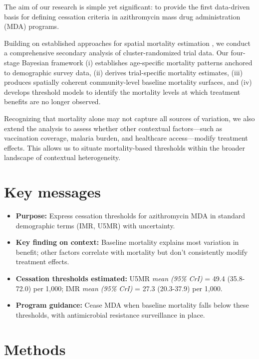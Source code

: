 \documentclass[11pt]{article}\usepackage[]{graphicx}\usepackage[]{xcolor}
\begin{document}
The aim of our research is simple yet significant: to provide the first data-driven basis for defining cessation criteria in azithromycin mass drug administration (MDA) programs.

Building on established approaches for spatial mortality estimation \citep{besag1991bym, mercer2015aoas, wakefield2020insr}, we conduct a comprehensive secondary analysis of cluster-randomized trial data. Our four-stage Bayesian framework (i) establishes age-specific mortality patterns anchored to demographic survey data, (ii) derives trial-specific mortality estimates, (iii) produces spatially coherent community-level baseline mortality surfaces, and (iv) develops threshold models to identify the mortality levels at which treatment benefits are no longer observed.

Recognizing that mortality alone may not capture all sources of variation, we also extend the analysis to assess whether other contextual factors—such as vaccination coverage, malaria burden, and healthcare access—modify treatment effects. This allows us to situate mortality-based thresholds within the broader landscape of contextual heterogeneity.


\section*{Key messages}



\begin{itemize}[leftmargin=1.1em]
\item \textbf{Purpose:} Express cessation thresholds for azithromycin MDA in standard demographic terms (IMR, U5MR) with uncertainty.
\item \textbf{Key finding on context:} Baseline mortality explains most variation in benefit; other factors correlate with mortality but don't consistently modify treatment effects.
\item \textbf{Cessation thresholds estimated:} U5MR \emph{mean (95\% CrI)} = 49.4 (35.8-72.0) per 1,000; IMR \emph{mean (95\% CrI)} = 27.3 (20.3-37.9) per 1,000.
\item \textbf{Program guidance:} Cease MDA when baseline mortality falls below these thresholds, with antimicrobial resistance surveillance in place.
\end{itemize}

\clearpage

\section{Methods}
\end{document}
